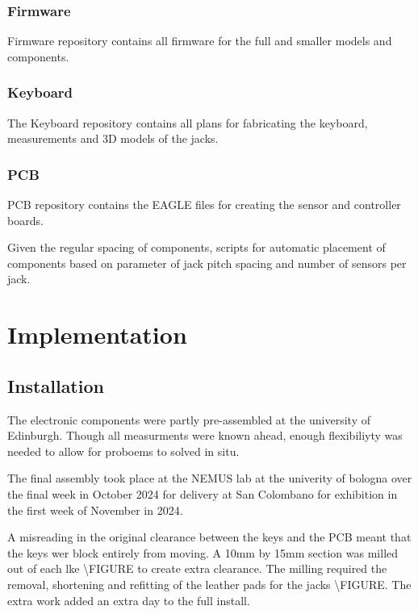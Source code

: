 \subsubsection{Firmware}\label{firmware}

Firmware repository contains all firmware for the full and smaller
models and components.

\subsubsection{Keyboard}\label{keyboard-1}

The Keyboard repository contains all plans for fabricating the keyboard,
measurements and 3D models of the jacks.

\subsubsection{PCB}\label{pcb}

PCB repository contains the EAGLE files for creating the sensor and
controller boards.

Given the regular spacing of components, scripts for automatic placement
of components based on parameter of jack pitch spacing and number of
sensors per jack.

\section{Implementation}\label{implementation}

\subsection{Installation}\label{installation}

The electronic components were partly pre-assembled at the university of
Edinburgh. Though all measurments were known ahead, enough flexibiliyty
was needed to allow for proboems to solved in situ.

The final assembly took place at the NEMUS lab at the univerity of
bologna over the final week in October 2024 for delivery at San
Colombano for exhibition in the first week of November in 2024.

A misreading in the original clearance between the keys and the PCB
meant that the keys wer block entirely from moving. A 10mm by 15mm
section was milled out of each lke \textbackslash FIGURE to create extra
clearance. The milling required the removal, shortening and refitting of
the leather pads for the jacks \textbackslash FIGURE. The extra work
added an extra day to the full install.


